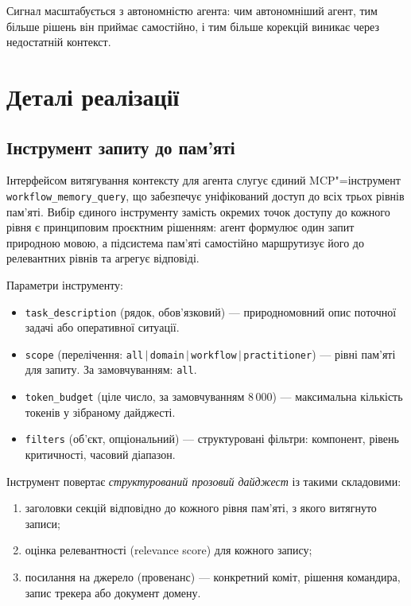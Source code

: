 \documentclass[11pt]{article}
\begin{document}
Сигнал масштабується з автономністю агента: чим автономніший агент, тим більше рішень він приймає самостійно, і тим більше корекцій виникає через недостатній контекст.


\section{Деталі реалізації}
\label{sec:implementation}

\subsection{Інструмент запиту до пам'яті}
\label{sec:memory-query-tool}

Інтерфейсом витягування контексту для агента слугує єдиний MCP"=інструмент \texttt{workflow\_memory\_query}, що забезпечує уніфікований доступ до всіх трьох рівнів пам'яті.
Вибір єдиного інструменту замість окремих точок доступу до кожного рівня є принциповим проєктним рішенням: агент формулює один запит природною мовою, а підсистема пам'яті самостійно маршрутизує його до релевантних рівнів та агрегує відповіді.

Параметри інструменту:
\begin{itemize}[leftmargin=*, nosep]
  \item \texttt{task\_description} (рядок, обов'язковий) --- природномовний опис поточної задачі або оперативної ситуації.
  \item \texttt{scope} (перелічення: \texttt{all}\,$|$\,\texttt{domain}\,$|$\,\texttt{workflow}\,$|$\,\texttt{practitioner}) --- рівні пам'яті для запиту. За замовчуванням: \texttt{all}.
  \item \texttt{token\_budget} (ціле число, за замовчуванням 8\,000) --- максимальна кількість токенів у зібраному дайджесті.
  \item \texttt{filters} (об'єкт, опціональний) --- структуровані фільтри: компонент, рівень критичності, часовий діапазон.
\end{itemize}

Інструмент повертає \emph{структурований прозовий дайджест} із такими складовими:
\begin{enumerate}[nosep]
  \item заголовки секцій відповідно до кожного рівня пам'яті, з якого витягнуто записи;
  \item оцінка релевантності (relevance score) для кожного запису;
  \item посилання на джерело (провенанс) --- конкретний коміт, рішення командира, запис трекера або документ домену.
\end{enumerate}
\end{document}
